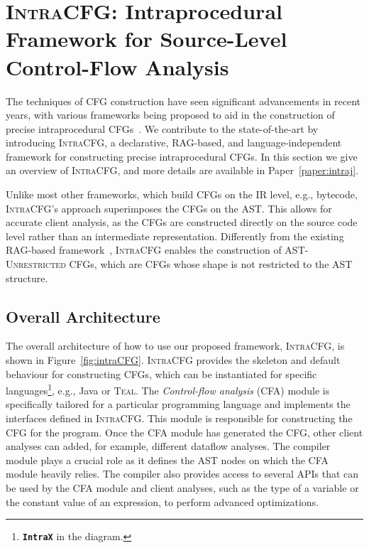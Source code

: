 \section{\textsc{IntraCFG}: Intraprocedural Framework for Source-Level Control-Flow Analysis}%
\label{sec:IntraCFG}
The techniques of CFG construction have seen significant advancements
in recent years, with various frameworks being proposed to aid in the construction
of precise intraprocedural CFGs~\cite{smits2020flowspec,10.1016/j.scico.2012.02.002}.
We contribute to the state-of-the-art by introducing \textsc{IntraCFG}, a declarative, RAG-based,
and language-independent framework for constructing precise intraprocedural CFGs.
In this section we give an overview of \textsc{IntraCFG}, and more details are available
in Paper~\ref{paper:intraj}.

Unlike most other frameworks, which build CFGs on the IR level,
e.g.,  bytecode, \textsc{IntraCFG}'s approach superimposes the CFGs
on the AST. This allows for accurate client analysis,
as the CFGs are constructed directly on the source code level rather than an
intermediate representation.
Differently from the existing RAG-based framework~\cite{10.1016/j.scico.2012.02.002},
\textsc{IntraCFG} enables the construction of \textsc{AST-Unrestricted} CFGs,
which are CFGs whose shape is not restricted to the AST structure.
\subsection{Overall Architecture}
The overall architecture of how to use our proposed framework, \textsc{IntraCFG}, is shown in Figure~\ref{fig:intraCFG}.
\textsc{IntraCFG} provides the skeleton and default behaviour for constructing CFGs,
which can be instantiated for specific languages\footnote{\textbf{\texttt{IntraX}} in the diagram.}, e.g., Java or \textsc{Teal}.
The \emph{Control-flow analysis} (CFA) module is specifically tailored for a particular
programming language and implements the interfaces defined in \textsc{IntraCFG}.
This module is responsible for constructing the CFG for the program.
Once the CFA module has generated the CFG,
other client analyses can added, for example, different dataflow analyses.
The compiler module plays a crucial role as it defines the AST nodes
on which the CFA module heavily relies. The compiler also provides access to
several APIs that can be used by the CFA module and client analyses, such as
the type of a variable or the constant value of an expression, to perform
advanced optimizations.

